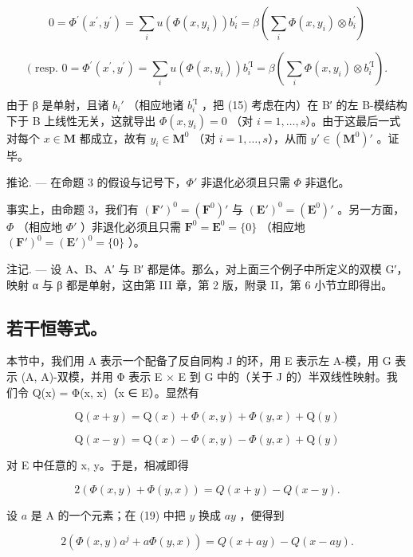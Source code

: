\[
0 = \Phi^ {\prime} (x ^ {\prime}, y ^ {\prime}) = \sum_ {i} u (\Phi (x, y _ {i})) b _ {i} ^ {\prime} = \beta (\sum_ {i} \Phi (x, y _ {i}) \otimes b _ {i} ^ {\prime})
\]

\[
(\text { resp. } 0 = \Phi^ {\prime} (x ^ {\prime}, y ^ {\prime}) = \sum_ {i} u (\Phi (x, y _ {i})) b _ {i} ^ {\prime \mathrm{I}} = \beta (\sum_ {i} \Phi (x, y _ {i}) \otimes b _ {i} ^ {\prime \mathrm{I}}).
\]

由于 β 是单射，且诸 \(b_i'\) （相应地诸 \(b _ {i} ^ {\prime \mathrm{I}}\) ，把 (15) 考虑在内）在 B′ 的左 B-模结构下于 B 上线性无关，这就导出 \(\Phi(x, y_i) = 0\) （对 \(i = 1, \ldots, s\)）。由于这最后一式对每个 \(x \in \mathbf{M}\) 都成立，故有 \(y_i \in \mathbf{M}^0\) （对 \(i = 1, \ldots, s\)），从而 \(y' \in (\mathbf{M}^0)'\) 。证毕。

推论. --- 在命题 3 的假设与记号下，\(\Phi'\) 非退化必须且只需 \(\Phi\) 非退化。

事实上，由命题 3，我们有 \((\mathbf{F}')^0 = (\mathbf{F}^0)'\) 与 \((\mathbf{E}')^0 = (\mathbf{E}^0)'\) 。另一方面，\(\Phi\) （相应地 \(\Phi'\) ）非退化必须且只需 \(\mathbf{F}^0 = \mathbf{E}^0 = \{0\}\) （相应地 \((\mathbf{F}')^0 = (\mathbf{E}')^0 = \{0\}\) ）。

注记. --- 设 A、B、A′ 与 B′ 都是体。那么，对上面三个例子中所定义的双模 G′，映射 α 与 β 都是单射，这由第 III 章，第 2 版，附录 II，第 6 小节立即得出。

\subsection{若干恒等式。}

本节中，我们用 A 表示一个配备了反自同构 J 的环，用 E 表示左 A-模，用 G 表示 (A, A)-双模，并用 Φ 表示 E × E 到 G 中的（关于 J 的）半双线性映射。我们令 Q(x) = Φ(x, x)（x ∈ E）。显然有

\[
\mathrm{Q} (x + y) = \mathrm{Q} (x) + \Phi (x, y) + \Phi (y, x) + \mathrm{Q} (y)\tag{17}
\]

\[
\mathrm{Q} (x - y) = \mathrm{Q} (x) - \Phi (x, y) - \Phi (y, x) + \mathrm{Q} (y)\tag{18}
\]

对 E 中任意的 x, y。于是，相减即得

\[
2 (\Phi (x, y) + \Phi (y, x)) = Q (x + y) - Q (x - y).\tag{19}
\]

设 \(a\) 是 A 的一个元素；在 (19) 中把 \(y\) 换成 \(ay\) ，便得到

\[
2 (\Phi (x, y) a ^ {j} + a \Phi (y, x)) = Q (x + a y) - Q (x - a y).\tag{20}
\]

